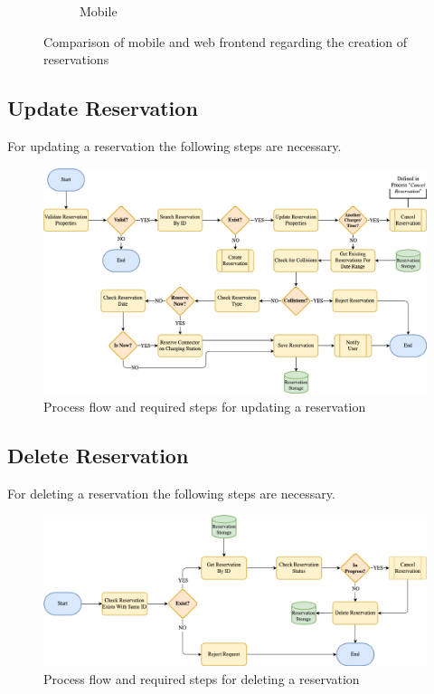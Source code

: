 \begin{figure}
\begin{subfigure}[b]{0.3\textwidth}
         \caption{Mobile}
         \label{fig:mobile-create-reservation}
    \end{subfigure}
    \caption{Comparison of mobile and web frontend regarding the creation of reservations}
    \label{fig:create-reservation-design}
\end{figure}

\subsection{Update Reservation}
\label{ch:Design:sec:Update Reservation}

For updating a reservation the following steps are necessary.

\begin{figure}[!ht]
    \centering
    \includegraphics[scale=0.4]{resources/images/main/5_design/processes/ReservationUpdate.png}
    \caption{Process flow and required steps for updating a reservation}
    \label{fig:update-reservation-flowchart}
\end{figure}

\subsection{Delete Reservation}
\label{ch:Design:sec:Use Cases:ssec:Delete Reservation}

For deleting a reservation the following steps are necessary.

\begin{figure}[!ht]
    \centering
    \includegraphics[scale=0.4]{resources/images/main/5_design/processes/ReservationDelete.png}
    \caption{Process flow and required steps for deleting a reservation}
    \label{fig:delete-reservation-flowchart}
\end{figure}

